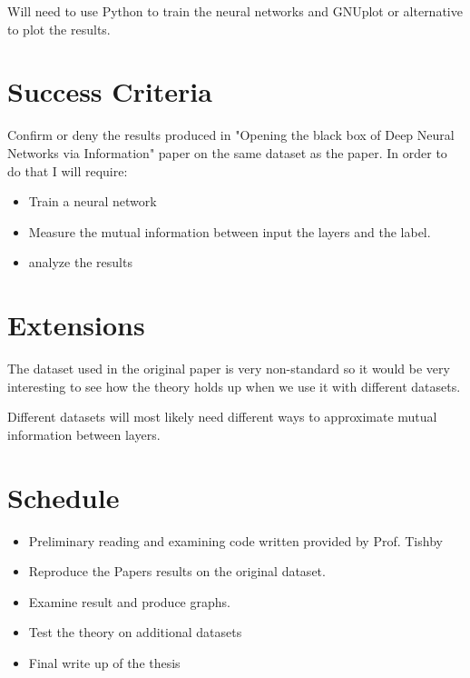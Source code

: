 \documentclass[12pt]{article}
\begin{document}
Will need to use Python to train the neural networks and GNUplot or alternative
to plot the results.

\section*{Success Criteria}

Confirm or deny the results produced in "Opening the black box of Deep Neural
Networks via Information" paper on the same dataset as the paper. In order to do
that I will require:

\begin{itemize}
  \item Train a neural network
  \item Measure the mutual information between input the layers and the label.
  \item analyze the results
\end{itemize}

\section*{Extensions}

The dataset used in the original paper is very non-standard so it would be very
interesting to see how the theory holds up when we use it with different
datasets.

Different datasets will most likely need different ways to approximate mutual
information between layers.

\section*{Schedule}




\begin{itemize}
  \item {

      Preliminary reading and examining code written provided by Prof. Tishby
  } \item {

      Reproduce the Papers results on the original dataset.
  } \item {

      Examine result and produce graphs.
  } \item {

      Test the theory on additional datasets 
  } \item {

      Final write up of the thesis
  }
\end{itemize}
\end{document}
